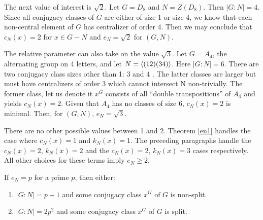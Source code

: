 \documentclass[main.tex]{subfiles}
\begin{document}
The next value of interest is $\sqrt{2}$. Let $G = D_8$ and $N = Z(D_8)$. Then $|G : N| = 4$. Since all conjugacy classes of $G$ are either of size 1 or size 4, we know that each non-central element of $G$ has centralizer of order 4. Then we may conclude that $c_N(x) = 2$ for $x \in G - N$ and $e_N = \sqrt{2}$ for $(G, N)$.

The relative parameter can also take on the value $\sqrt{3}$. Let $G = A_4$, the alternating group on 4 letters, and let $N = \langle (12)(34) \rangle$. Here $|G : N| = 6$. There are two conjugacy class sizes other than 1: 3 and 4 \cite{smallgroups}. The latter classes are larger but must have centralizers of order 3 which cannot intersect N non-trivially. The former class, let us denote it $x^G$ consists of all ``double transpositions'' of $A_4$ and yields $c_N(x) = 2$. Given that $A_4$ has no classes of size 6, $c_N(x) = 2$ is minimal. Then, for $(G, N)$, $e_N = \sqrt{3}$.

There are no other possible values between 1 and 2. Theorem \ref{en1} handles the case where $c_N(x) = 1$ and $k_N(x) = 1$. The preceding paragraphs handle the $c_N(x) = 2$, $k_N(x) = 2$ and the $c_N(x) = 2$, $k_N(x) = 3$ cases respectively. All other choices for these terms imply $e_N \ge 2$.

\begin{theorem}
If $e_N = p$ for a prime $p$, then either:
\begin{enumerate}
	\item $|G:N| = p + 1$ and some conjugacy class $x^G$ of $G$ is non-split.
	\item $|G:N| = 2p^2$ and some conjugacy class $x^G$ of $G$ is split.
\end{enumerate}
\end{theorem}
\end{document}
